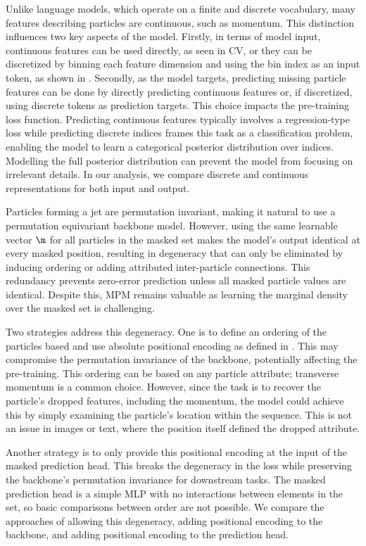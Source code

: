 Unlike language models, which operate on a finite and discrete vocabulary, many features describing particles are continuous, such as momentum.
This distinction influences two key aspects of the model.
Firstly, in terms of model input, continuous features can be used directly, as seen in CV, or they can be discretized by binning each feature dimension and using the bin index as an input token, as shown in \textcite{JetGPT}.
Secondly, as the model targets, predicting missing particle features can be done by directly predicting continuous features or, if discretized, using discrete tokens as prediction targets.
This choice impacts the pre-training loss function.
Predicting continuous features typically involves a regression-type loss while predicting discrete indices frames this task as a classification problem, enabling the model to learn a categorical posterior distribution over indices.
Modelling the full posterior distribution can prevent the model from focusing on irrelevant details.
In our analysis, we compare discrete and continuous representations for both input and output.

Particles forming a jet are permutation invariant, making it natural to use a permutation equivariant backbone model.
However, using the same learnable vector $\m$ for all particles in the masked set makes the model's output identical at every masked position, resulting in degeneracy that can only be eliminated by inducing ordering or adding attributed inter-particle connections.
This redundancy prevents zero-error prediction unless all masked particle values are identical.
Despite this, MPM remains valuable as learning the marginal density over the masked set is challenging.

Two strategies address this degeneracy.
One is to define an ordering of the particles based and use absolute positional encoding as defined in .
This may compromise the permutation invariance of the backbone, potentially affecting the pre-training.
This ordering can be based on any particle attribute; transverse momentum is a common choice.
However, since the task is to recover the particle's dropped features, including the momentum, the model could achieve this by simply examining the particle's location within the sequence.
This is not an issue in images or text, where the position itself defined the dropped attribute.

Another strategy is to only provide this positional encoding at the input of the masked prediction head.
This breaks the degeneracy in the loss while preserving the backbone's permutation invariance for downstream tasks.
The masked prediction head is a simple MLP with no interactions between elements in the set, so basic comparisons between order are not possible.
We compare the approaches of allowing this degeneracy, adding positional encoding to the backbone, and adding positional encoding to the prediction head.

